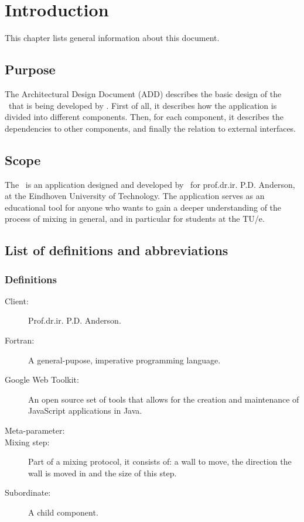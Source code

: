 \chapter{Introduction}

This chapter lists general information about this document.

\section{Purpose}
The Architectural Design Document (ADD) describes the basic design of the \applicationname\ that is being developed by \projectauthor. First of all, it describes how the application is divided into different components. Then, for each component, it describes the dependencies to other components, and finally the relation to external interfaces.

\section{Scope}
The \applicationname\ is an application designed and developed by \projectauthor\ for prof.dr.ir. P.D. Anderson, at the Eindhoven University of Technology. The application serves as an educational tool for anyone who wants to gain a deeper understanding of the process of mixing in general, and in particular for students at the TU/e.

\section{List of definitions and abbreviations}
\subsection{Definitions}
\begin{description}
\item[Client:] Prof.dr.ir. P.D. Anderson.
\item[Fortran:] A general-pupose, imperative programming language.
\item[Google Web Toolkit:] An open source set of tools that allows for the creation and maintenance of JavaScript applications in Java.
\item[Meta-parameter:] 
\item[Mixing step:] Part of a mixing protocol, it consists of: a wall to move, the direction the wall is moved in and the size of this step.
\item[Subordinate:] A child component.
\end{description}

